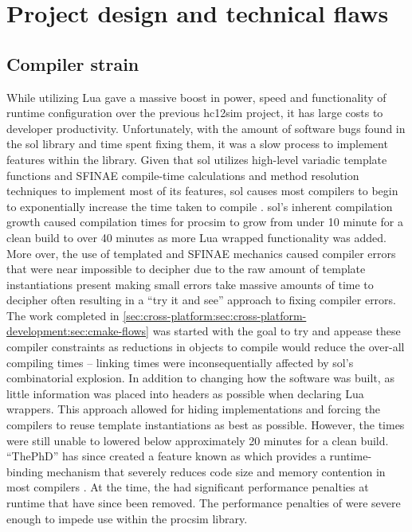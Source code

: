 \section{Project design and technical flaws}

\subsection{Compiler strain}

While utilizing Lua gave a massive boost in power, speed and functionality of runtime configuration over the previous hc12sim project, it has large costs to developer productivity. Unfortunately, with the amount of software bugs found in the sol library and time spent fixing them, it was a slow process to implement features within the library. Given that sol utilizes high-level variadic template functions and SFINAE compile-time calculations and method resolution techniques \cite{cppreference:SFINAE} to implement most of its features, sol causes most compilers to begin to exponentially increase the time taken to compile \cite{Github:ThePhD:sol2:issue:126, Github:ThePhD:sol2:issue:295, Github:ThePhD:sol2:compilation}. sol's inherent compilation growth caused compilation times for procsim to grow from under 10 minute for a clean build to over 40 minutes as more Lua wrapped functionality was added. More over, the use of templated and SFINAE mechanics caused compiler errors that were near impossible to decipher due to the raw amount of template instantiations present making small errors take massive amounts of time to decipher often resulting in a ``try it and see'' approach to fixing compiler errors. The work completed in \cref{sec:cross-platform:sec:cross-platform-development:sec:cmake-flows} was started with the goal to try and appease these compiler constraints as reductions in objects to compile would reduce the over-all compiling times -- linking times were inconsequentially affected by sol's combinatorial explosion. In addition to changing how the software was built, as little information was placed into headers as possible when declaring Lua wrappers. This approach allowed for hiding implementations and forcing the compilers to reuse template instantiations as best as possible. However, the times were still unable to lowered below approximately 20 minutes for a clean build. ``ThePhD'' has since created a feature known as  which provides a runtime-binding mechanism that severely reduces code size and memory contention in most compilers \cite{Github:ThePhD:sol2:simple-usertype}. At the time, the  had significant performance penalties at runtime that have since been removed. The performance penalties of  were severe enough to impede use within the procsim library.

